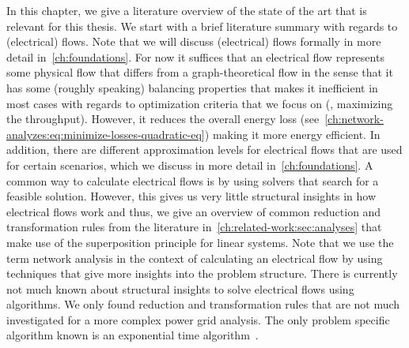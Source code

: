 \label{ch:related-work}
% 
In this chapter, we give a literature overview of the state of the art that is
relevant for this thesis. We start with a brief literature summary with regards
to (electrical) flows. Note that we will discuss (electrical) flows formally in
more detail in~\cref{ch:foundations}. For now it suffices that an electrical
flow represents some physical flow that differs from a graph-theoretical flow in
the sense that it has some (roughly speaking) balancing properties that makes it
inefficient in most cases with regards to optimization criteria that we focus on
(\eg, maximizing the throughput). However, it reduces the overall energy loss
(see~\cref{ch:network-analyzes:eq:minimize-losses-quadratic-eq}) making it more
energy efficient. In addition, there are different approximation levels for
electrical flows that are used for certain scenarios, which we discuss in more
detail in~\cref{ch:foundations}. A common way to calculate electrical flows is
by using solvers that search for a feasible solution. However, this gives us
very little structural insights in how electrical flows work and thus, we give
an overview of common reduction and transformation rules from the literature
in~\cref{ch:related-work:sec:analyses} that make use of the superposition
principle for linear systems. Note that we use the term network analysis in the
context of calculating an electrical flow by using techniques that give more
insights into the problem structure.
% 
There is currently not much known about structural insights to solve electrical
flows using algorithms. We only found reduction and transformation rules that are
not much investigated for a more complex power grid analysis. The only problem
specific algorithm known is an exponential time
algorithm~\parencite{Ses61,Sha87}. 

